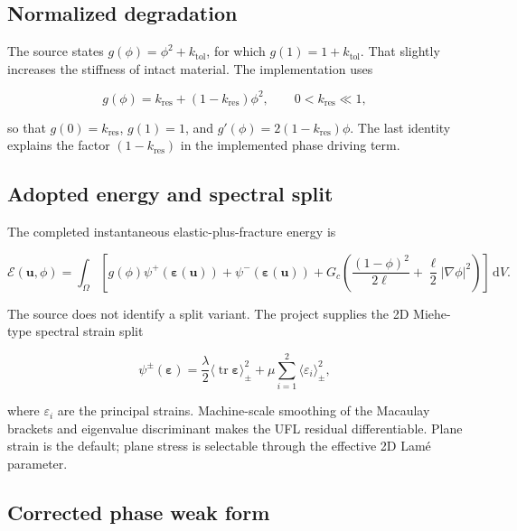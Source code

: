 \documentclass[11pt,a4paper]{article}
\begin{document}
\subsection{Normalized degradation}

The source states $g(\phi)=\phi^2+k_{\mathrm{tol}}$, for which
$g(1)=1+k_{\mathrm{tol}}$. That slightly increases the stiffness of intact
material. The implementation uses

\begin{equation}
  g(\phi)=k_{\mathrm{res}}
          +(1-k_{\mathrm{res}})\phi^2,
  \qquad 0<k_{\mathrm{res}}\ll1,
  \label{eq:normalized-g}
\end{equation}

so that $g(0)=k_{\mathrm{res}}$, $g(1)=1$, and
$g'(\phi)=2(1-k_{\mathrm{res}})\phi$. The last identity explains the factor
$(1-k_{\mathrm{res}})$ in the implemented phase driving term.

\subsection{Adopted energy and spectral split}

The completed instantaneous elastic-plus-fracture energy is

\begin{equation}
  \mathcal{E}(\boldsymbol{u},\phi)
  =\int_\Omega\left[
    g(\phi)\psi^+(\boldsymbol{\varepsilon}(\boldsymbol{u}))
    +\psi^-(\boldsymbol{\varepsilon}(\boldsymbol{u}))
    +G_c\left(
       \frac{(1-\phi)^2}{2\ell}
       +\frac{\ell}{2}|\nabla\phi|^2
    \right)
  \right]\,\mathrm{d}V.
  \label{eq:implemented-energy}
\end{equation}

The source does not identify a split variant. The project supplies the 2D
Miehe-type spectral strain split

\begin{equation}
  \psi^\pm(\boldsymbol{\varepsilon})
  =\frac{\lambda}{2}\langle\operatorname{tr}\boldsymbol{\varepsilon}\rangle_\pm^2
   +\mu\sum_{i=1}^{2}\langle\varepsilon_i\rangle_\pm^2,
  \label{eq:spectral-split}
\end{equation}

where $\varepsilon_i$ are the principal strains. Machine-scale smoothing of
the Macaulay brackets and eigenvalue discriminant makes the UFL residual
differentiable. Plane strain is the default; plane stress is selectable through
the effective 2D Lam\'e parameter.

\subsection{Corrected phase weak form}
\end{document}
